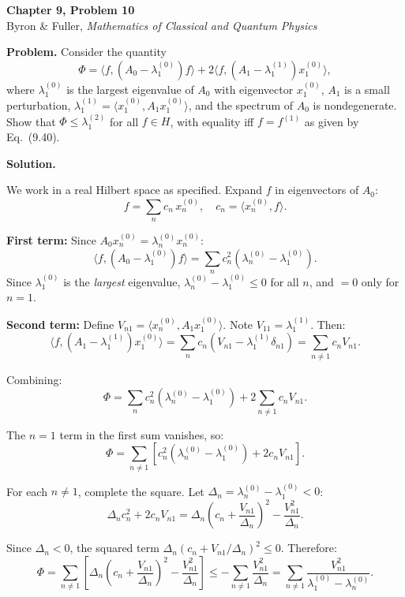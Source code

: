 \documentclass[12pt]{article}
\begin{document}
\begin{center}
{\Large\bfseries Chapter 9, Problem 10}\\[6pt]
Byron \& Fuller, \textit{Mathematics of Classical and Quantum Physics}
\end{center}

\bigskip

\textbf{Problem.} Consider the quantity
\[
\Phi = \langle f, (A_0 - \lambda_1^{(0)})f\rangle + 2\langle f, (A_1 - \lambda_1^{(1)})x_1^{(0)}\rangle,
\]
where $\lambda_1^{(0)}$ is the largest eigenvalue of $A_0$ with eigenvector $x_1^{(0)}$, $A_1$ is a small perturbation, $\lambda_1^{(1)} = \langle x_1^{(0)}, A_1 x_1^{(0)}\rangle$, and the spectrum of $A_0$ is nondegenerate. Show that $\Phi \le \lambda_1^{(2)}$ for all $f \in H$, with equality iff $f = f^{(1)}$ as given by Eq.~(9.40).

\bigskip
\textbf{Solution.}

We work in a real Hilbert space as specified. Expand $f$ in eigenvectors of $A_0$:
\[
f = \sum_n c_n\,x_n^{(0)}, \quad c_n = \langle x_n^{(0)}, f\rangle.
\]

\textbf{First term:} Since $A_0 x_n^{(0)} = \lambda_n^{(0)} x_n^{(0)}$:
\[
\langle f, (A_0 - \lambda_1^{(0)})f\rangle = \sum_n c_n^2(\lambda_n^{(0)} - \lambda_1^{(0)}).
\]
Since $\lambda_1^{(0)}$ is the \emph{largest} eigenvalue, $\lambda_n^{(0)} - \lambda_1^{(0)} \le 0$ for all $n$, and $= 0$ only for $n = 1$.

\textbf{Second term:} Define $V_{n1} = \langle x_n^{(0)}, A_1 x_1^{(0)}\rangle$. Note $V_{11} = \lambda_1^{(1)}$. Then:
\[
\langle f, (A_1 - \lambda_1^{(1)})x_1^{(0)}\rangle = \sum_n c_n(V_{n1} - \lambda_1^{(1)}\delta_{n1}) = \sum_{n \neq 1} c_n V_{n1}.
\]

Combining:
\[
\Phi = \sum_n c_n^2(\lambda_n^{(0)} - \lambda_1^{(0)}) + 2\sum_{n \neq 1} c_n V_{n1}.
\]

The $n = 1$ term in the first sum vanishes, so:
\[
\Phi = \sum_{n \neq 1} \left[c_n^2(\lambda_n^{(0)} - \lambda_1^{(0)}) + 2c_n V_{n1}\right].
\]

For each $n \neq 1$, complete the square. Let $\Delta_n = \lambda_n^{(0)} - \lambda_1^{(0)} < 0$:
\[
\Delta_n c_n^2 + 2c_n V_{n1} = \Delta_n\!\left(c_n + \frac{V_{n1}}{\Delta_n}\right)^{\!2} - \frac{V_{n1}^2}{\Delta_n}.
\]

Since $\Delta_n < 0$, the squared term $\Delta_n(c_n + V_{n1}/\Delta_n)^2 \le 0$. Therefore:
\[
\Phi = \sum_{n \neq 1}\left[\Delta_n\!\left(c_n + \frac{V_{n1}}{\Delta_n}\right)^{\!2} - \frac{V_{n1}^2}{\Delta_n}\right] \le -\sum_{n \neq 1} \frac{V_{n1}^2}{\Delta_n} = \sum_{n \neq 1} \frac{V_{n1}^2}{\lambda_1^{(0)} - \lambda_n^{(0)}}.
\]
\end{document}
